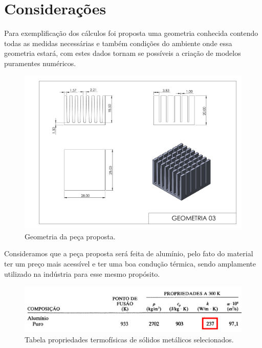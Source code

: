 \chapter{Considerações}\label{cap:definitions}

Para exemplificação dos cálculos foi proposta uma geometria conhecida contendo todas as medidas necessárias e também condições do ambiente onde essa geometria estará, com estes dados tornam se possíveis a criação de modelos puramentes numéricos.

\begin{figure}[h]
    \centering
    \caption{Geometria da peça proposta.}
    \label{fig:geometry}
    \includegraphics[width=15cm]{figuras/geometria.pdf}
    \fonteproprioautor
\end{figure}

Consideramos que a peça proposta será feita de alumínio, pelo fato do material ter um preço mais acessível e ter uma boa condução térmica, sendo amplamente utilizado na indústria para esse mesmo propósito.

\begin{figure}[h]
    \centering
    \caption{Tabela propriedades termofísicas de sólidos metálicos selecionados.}
    \label{fig:metalProps}
    \includegraphics[width=14cm]{figuras/metalProps.jpg}
\end{figure}


